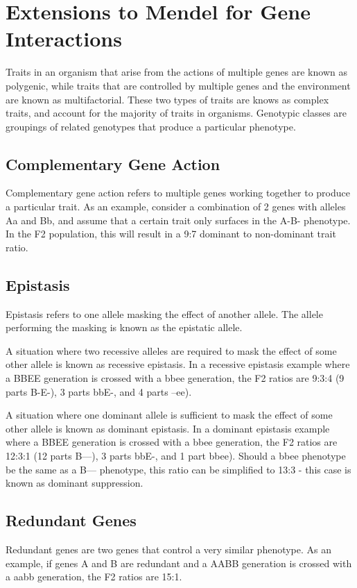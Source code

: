 \documentclass[12pt,titlepage]{article}
\begin{document}
    \section{Extensions to Mendel for Gene Interactions}
      Traits in an organism that arise from the actions of multiple genes are known as polygenic, while traits that are controlled by multiple genes and the environment
      are known as multifactorial. These two types of traits are knows as complex traits, and account for the majority of traits in organisms. Genotypic classes are
      groupings of related genotypes that produce a particular phenotype.

      \subsection{Complementary Gene Action}
        Complementary gene action refers to multiple genes working together to produce a particular trait. As an example, consider a combination of 2 genes with alleles
        Aa and Bb, and assume that a certain trait only surfaces in the A-B- phenotype. In the F2 population, this will result in a 9:7 dominant to non-dominant trait
        ratio.

      \subsection{Epistasis}
        Epistasis refers to one allele masking the effect of another allele. The allele performing the masking is known as the epistatic allele.

        A situation where two recessive alleles are required to mask the effect of some other allele is known as recessive epistasis. In a recessive
        epistasis example where a BBEE generation is crossed with a bbee generation, the F2 ratios are 9:3:4 (9 parts B-E-), 3 parts bbE-, and 4 parts --ee).

        A situation where one dominant allele is sufficient to mask the effect of some other allele is known as dominant epistasis. In a dominant
        epistasis example where a BBEE generation is crossed with a bbee generation, the F2 ratios are 12:3:1 (12 parts B---), 3 parts bbE-, and 1 part bbee).
        Should a bbee phenotype be the same as a B--- phenotype, this ratio can be simplified to 13:3 - this case is known as dominant suppression.

      \subsection{Redundant Genes}
        Redundant genes are two genes that control a very similar phenotype. As an example, if genes A and B are redundant and a AABB generation is crossed
        with a aabb generation, the F2 ratios are 15:1.
\end{document}
